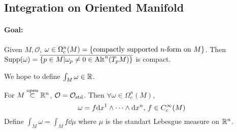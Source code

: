 \subsection{Integration on Oriented Manifold}
\paragraph{Goal:} Given  $ M,\mathcal{O} $,  $ \omega\in  \name{$ \Omega_c^n(M) $} =\{\text{compactly supported  $ n $-form on  $ M $}\} $. Then  $ \mathrm{Supp}(\omega)=\overline{\{p\in M|\omega_p\neq 0\in \mathrm{Alt}^n(T_pM)\}} $ is compact.

We hope to define  $ \int_M\omega\in\mathbb R $.

For  $ M\overset{\text{open}}{\subset} \mathbb R^n $,  $ \mathcal{O}=\mathcal{O}_{\mathrm{std}} $. Then  $ \forall \omega\in \Omega_c^n(M) $,
\[\omega=f\mathrm{d} {x}^1\wedge\cdots\wedge\mathrm{d} {x}^n,\,f\in C_c^\infty(M)\]
Define  $ \int_M\omega=\int_M f\dd \mu $ where  $ \mu $ is the standart Lebesgue measure on  $ \mathbb R^n $.

